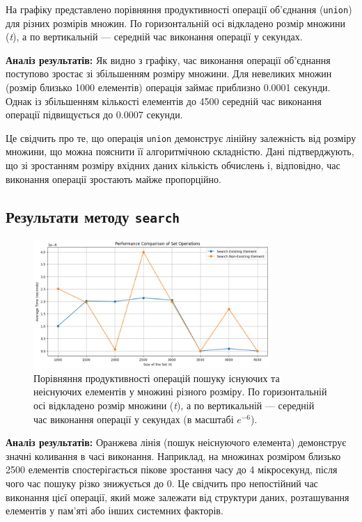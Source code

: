 \documentclass[a4paper,12pt]{article}
\begin{document}
На графіку представлено порівняння продуктивності операції об'єднання (\texttt{union}) для різних розмірів множин. По горизонтальній осі відкладено розмір множини (\textit{t}), а по вертикальній — середній час виконання операції у секундах.

\textbf{Аналіз результатів:} Як видно з графіку, час виконання операції об'єднання поступово зростає зі збільшенням розміру множини. Для невеликих множин (розмір близько 1000 елементів) операція займає приблизно 0.0001 секунди. Однак із збільшенням кількості елементів до 4500 середній час виконання операції підвищується до 0.0007 секунди.

Це свідчить про те, що операція \texttt{union} демонструє лінійну залежність від розміру множини, що можна пояснити її алгоритмічною складністю. Дані підтверджують, що зі зростанням розміру вхідних даних кількість обчислень і, відповідно, час виконання операції зростають майже пропорційно.

\subsection{Результати методу \texttt{search}}
\begin{figure}[h!]
\centering
\includegraphics[width=0.8\textwidth]{img/Search.png}
\caption{Порівняння продуктивності операцій пошуку існуючих та неіснуючих елементів у множині різного розміру. По горизонтальній осі відкладено розмір множини (\textit{t}), а по вертикальній — середній час виконання операції у секундах (в масштабі \( e^{-6} \)).}
\label{fig:search}
\end{figure}

\textbf{Аналіз результатів:} Оранжева лінія (пошук неіснуючого елемента) демонструє значні коливання в часі виконання. Наприклад, на множинах розміром близько 2500 елементів спостерігається пікове зростання часу до 4 мікросекунд, після чого час пошуку різко знижується до 0. Це свідчить про непостійний час виконання цієї операції, який може залежати від структури даних, розташування елементів у пам'яті або інших системних факторів.
\end{document}
